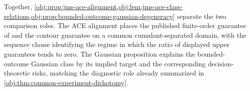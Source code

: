 Together, \cref{obj:prop:jms-ace-alignment,obj:lem:jms-ace-class-relations,obj:prop:bounded-outcome-gaussian-degeneracy} separate the two comparison roles. The ACE alignment places the published finite-order guarantee of \citet{JinMackeySyrgkanis2025} and the contour guarantee on a common cumulant-separated domain, with the sequence clause identifying the regime in which the ratio of displayed upper guarantees tends to zero. The Gaussian proposition explains the bounded-outcome Gaussian class by its implied target and the corresponding decision-theoretic risks, matching the diagnostic role already summarized in \cref{obj:thm:common-experiment-dichotomy}.

